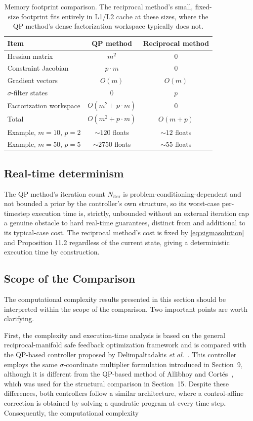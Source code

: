 \documentclass[11pt,onecolumn]{article}
\theoremstyle{definition}
\theoremstyle{remark}
\begin{document}
\begin{table}[H]
\centering
\caption{Memory footprint comparison. The reciprocal method's small, fixed-size footprint fits
entirely in L1/L2 cache at these sizes, where the QP method's dense factorization workspace
typically does not.}
\label{tab:memory}
\begin{tabular}{@{}lcc@{}}
\toprule
Item & QP method & Reciprocal method \\
\midrule
Hessian matrix & $m^2$ & 0 \\
Constraint Jacobian & $p \cdot m$ & 0 \\
Gradient vectors & $O(m)$ & $O(m)$ \\
$\sigma$-filter states & 0 & $p$ \\
Factorization workspace & $O(m^2 + p \cdot m)$ & 0 \\
\midrule
Total & $O(m^2 + p \cdot m)$ & $O(m+p)$ \\
Example, $m=10$, $p=2$ & $\sim 120$ floats & $\sim 12$ floats \\
Example, $m=50$, $p=5$ & $\sim 2750$ floats & $\sim 55$ floats \\
\bottomrule
\end{tabular}
\end{table}

\subsection{Real-time determinism}
The QP method's iteration count $N_{\mathrm{iter}}$ is problem-conditioning-dependent and not
bounded a prior by the controller's own structure, so its worst-case per-timestep execution
time is, strictly, unbounded without an external iteration cap a genuine obstacle to hard
real-time guarantees, distinct from and additional to its typical-case cost. The reciprocal
method's cost is fixed by \eqref{eq:sigmasolution} and Proposition 11.2 regardless of the
current state, giving a deterministic execution time by construction.



\subsection{Scope of the Comparison}

The computational complexity results presented in this section should be interpreted within the scope of the comparison. Two important points are worth clarifying.

First, the complexity and execution-time analysis is based on the general reciprocal-manifold safe feedback optimization framework and is compared with the QP-based controller proposed by Delimpaltadakis \emph{et al.}~\cite{delimpaltadakis2026}. This controller employs the same $\sigma$-coordinate multiplier formulation introduced in Section~9, although it is different from the QP-based method of Allibhoy and Cortés~\cite{allibhoy2024}, which was used for the structural comparison in Section~15. Despite these differences, both controllers follow a similar architecture, where a control-affine correction is obtained by solving a quadratic program at every time step. Consequently, the computational complexity
\end{document}
